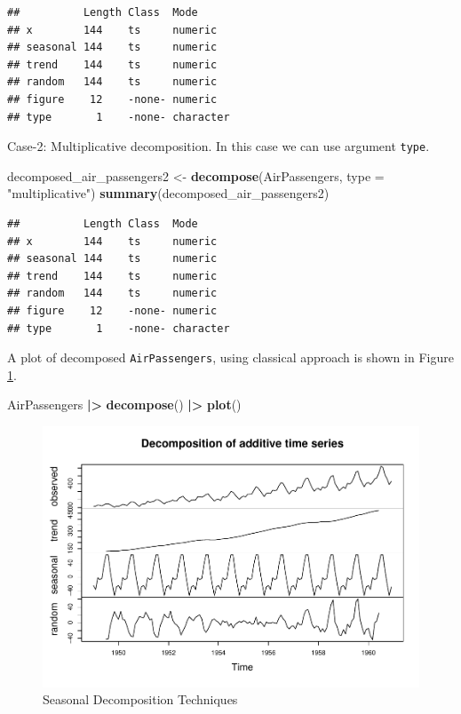 \documentclass[
]{book}
\newenvironment{Shaded}{\begin{snugshade}}{\end{snugshade}}
\newcommand{\AttributeTok}[1]{\textcolor[rgb]{0.13,0.29,0.53}{#1}}
\newcommand{\FunctionTok}[1]{\textcolor[rgb]{0.13,0.29,0.53}{\textbf{#1}}}
\newcommand{\NormalTok}[1]{#1}
\newcommand{\OtherTok}[1]{\textcolor[rgb]{0.56,0.35,0.01}{#1}}
\newcommand{\SpecialCharTok}[1]{\textcolor[rgb]{0.81,0.36,0.00}{\textbf{#1}}}
\newcommand{\StringTok}[1]{\textcolor[rgb]{0.31,0.60,0.02}{#1}}
\begin{document}
\begin{verbatim}
##          Length Class  Mode     
## x        144    ts     numeric  
## seasonal 144    ts     numeric  
## trend    144    ts     numeric  
## random   144    ts     numeric  
## figure    12    -none- numeric  
## type       1    -none- character
\end{verbatim}

Case-2: Multiplicative decomposition. In this case we can use argument \texttt{type}.

\begin{Shaded}
\begin{Highlighting}[]
\NormalTok{decomposed\_air\_passengers2 }\OtherTok{\textless{}{-}} \FunctionTok{decompose}\NormalTok{(AirPassengers, }\AttributeTok{type =} \StringTok{"multiplicative"}\NormalTok{)}
\FunctionTok{summary}\NormalTok{(decomposed\_air\_passengers2)}
\end{Highlighting}
\end{Shaded}

\begin{verbatim}
##          Length Class  Mode     
## x        144    ts     numeric  
## seasonal 144    ts     numeric  
## trend    144    ts     numeric  
## random   144    ts     numeric  
## figure    12    -none- numeric  
## type       1    -none- character
\end{verbatim}

A plot of decomposed \texttt{AirPassengers}, using classical approach is shown in Figure \ref{fig:stl1}.

\begin{Shaded}
\begin{Highlighting}[]
\NormalTok{AirPassengers }\SpecialCharTok{|\textgreater{}}
  \FunctionTok{decompose}\NormalTok{() }\SpecialCharTok{|\textgreater{}}
  \FunctionTok{plot}\NormalTok{()}
\end{Highlighting}
\end{Shaded}

\begin{figure}

{\centering \includegraphics{DauR_files/figure-latex/stl1-1} 

}

\caption{Seasonal Decomposition Techniques}\label{fig:stl1}
\end{figure}
\end{document}

